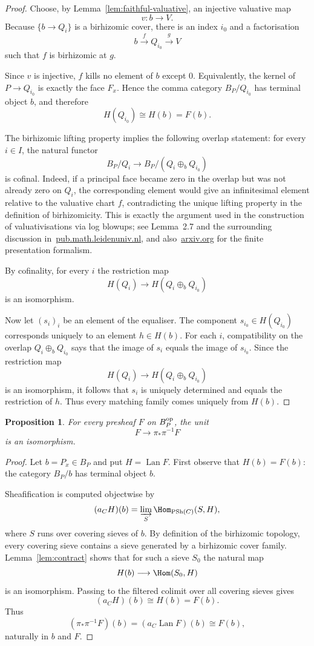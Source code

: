 \documentclass{article}
\newtheorem{prop}[thm]{Proposition}
\theoremstyle{remark}
\DeclareMathOperator{\PSh}{PSh}
\DeclareMathOperator{\Lan}{Lan}
\begin{document}
\begin{proof}
Choose, by Lemma~\ref{lem:faithful-valuative}, an injective valuative map
\[
v:b\longrightarrow V.
\]
Because $\{b\to Q_i\}$ is a birhizomic cover, there is an index $i_0$ and a factorisation
\[
b\xrightarrow{f} Q_{i_0}\xrightarrow{g} V
\]
such that $f$ is birhizomic at $g$.

Since $v$ is injective, $f$ kills no element of $b$ except $0$.  Equivalently, the kernel of $P\to Q_{i_0}$ is exactly the face $F_x$.  Hence the comma category $B_P/Q_{i_0}$ has terminal object $b$, and therefore
\[
H(Q_{i_0})\cong H(b)=F(b).
\]

The birhizomic lifting property implies the following overlap statement: for every $i\in I$, the natural functor
\[
B_P/Q_i\longrightarrow B_P/(Q_i\oplus_b Q_{i_0})
\]
is cofinal.  Indeed, if a principal face became zero in the overlap but was not already zero on $Q_i$, the corresponding element would give an infinitesimal element relative to the valuative chart $f$, contradicting the unique lifting property in the definition of birhizomicity.  This is exactly the argument used in the construction of valuativisations via log blowups; see Lemma~2.7 and the surrounding discussion in~\href{https://pub.math.leidenuniv.nl/~holmesdst/notes_from_talks/valuativisations_talk.pdf}{pub.math.leidenuniv.nl}, and also~\href{https://arxiv.org/pdf/2411.13662}{arxiv.org} for the finite presentation formalism.

By cofinality, for every $i$ the restriction map
\[
H(Q_i)\longrightarrow H(Q_i\oplus_b Q_{i_0})
\]
is an isomorphism.

Now let $(s_i)_i$ be an element of the equaliser.  The component $s_{i_0}\in H(Q_{i_0})$ corresponds uniquely to an element $h\in H(b)$.  For each $i$, compatibility on the overlap $Q_i\oplus_b Q_{i_0}$ says that the image of $s_i$ equals the image of $s_{i_0}$.  Since the restriction map
\[
H(Q_i)\to H(Q_i\oplus_b Q_{i_0})
\]
is an isomorphism, it follows that $s_i$ is uniquely determined and equals the restriction of $h$.  Thus every matching family comes uniquely from $H(b)$.
\end{proof}

\begin{prop}\label{prop:unit-iso}
For every presheaf $F$ on $B_P^{\rm op}$, the unit
\[
F\longrightarrow \pi_*\pi^{-1}F
\]
is an isomorphism.
\end{prop}
\begin{proof}
Let $b=P_x\in B_P$ and put $H=\Lan F$.  First observe that $H(b)=F(b)$: the category $B_P/b$ has terminal object $b$.

Sheafification is computed objectwise by
\[
(a_CH)(b)=\varinjlim_{S} \Hom_{\PSh(C)}(S,H),
\]
where $S$ runs over covering sieves of $b$.  By definition of the birhizomic topology, every covering sieve contains a sieve generated by a birhizomic cover family.  Lemma~\ref{lem:contract} shows that for such a sieve $S_0$ the natural map
\[
H(b)\longrightarrow \Hom(S_0,H)
\]
is an isomorphism.  Passing to the filtered colimit over all covering sieves gives
\[
(a_CH)(b)\cong H(b)=F(b).
\]
Thus
\[
(\pi_*\pi^{-1}F)(b)=(a_C\Lan F)(b)\cong F(b),
\]
naturally in $b$ and $F$.
\end{proof}
\end{document}
